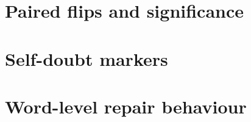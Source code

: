\documentclass[11pt]{article}
\begin{document}
\section{Paired flips and significance}
\label{app:flips}
\begin{table}[!ht]
\centering\small

\caption{Right-to-wrong and wrong-to-right flips against the \texttt{clean}
condition on jointly answered questions, with continuity-corrected McNemar
$p$-values.}
\label{tab:fullflips}
\end{table}

\section{Self-doubt markers}
\label{app:doubt}
\begin{table}[!ht]
\centering\small

\caption{Doubt-marker density per 1k generated tokens, per configuration.}
\label{tab:fulldoubt}
\end{table}

\section{Word-level repair behaviour}
\label{app:repair}
\begin{table}[!ht]
\centering\small

\caption{Word-level classification of every corrupted word: silently fixed,
explicitly flagged, misread, or not used in the trace.}
\label{tab:fullrepair}
\end{table}
\end{document}
